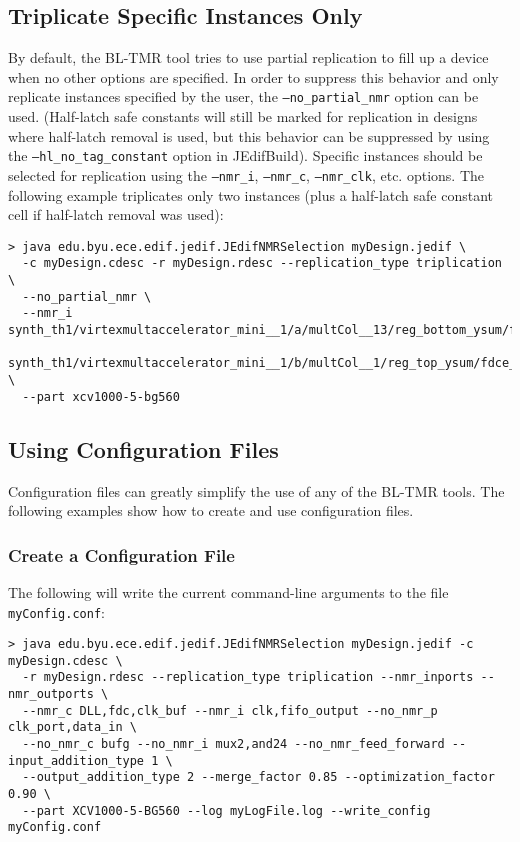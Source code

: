 \subsection{Triplicate Specific Instances Only}
By default, the BL-TMR tool tries to use partial replication to fill up a
device when no other options are specified. In order to suppress this behavior
and only replicate instances specified by the user, the
\texttt{--no\_partial\_nmr} option can be used. (Half-latch safe constants will
still be marked for replication in designs where half-latch removal is used, but
this behavior can be suppressed by using the \texttt{--hl\_no\_tag\_constant}
option in JEdifBuild). Specific instances should be selected for replication
using the \texttt{--nmr\_i}, \texttt{--nmr\_c}, \texttt{--nmr\_clk}, etc.
options. The following example triplicates only two instances (plus a
half-latch safe constant cell if half-latch removal was used):
\begin{verbatim}
> java edu.byu.ece.edif.jedif.JEdifNMRSelection myDesign.jedif \
  -c myDesign.cdesc -r myDesign.rdesc --replication_type triplication \
  --no_partial_nmr \
  --nmr_i synth_th1/virtexmultaccelerator_mini__1/a/multCol__13/reg_bottom_ysum/fdce,\
  synth_th1/virtexmultaccelerator_mini__1/b/multCol__1/reg_top_ysum/fdce__5 \
  --part xcv1000-5-bg560
\end{verbatim}

\subsection{Using Configuration Files}
\label{using config}
Configuration files can greatly simplify the use of any of the
BL-TMR tools.  The following examples show how to create and use
configuration files.

\subsubsection{Create a Configuration File}
The following will write the current command-line arguments to the file
\texttt{myConfig.conf}:

\begin{verbatim}
> java edu.byu.ece.edif.jedif.JEdifNMRSelection myDesign.jedif -c myDesign.cdesc \
  -r myDesign.rdesc --replication_type triplication --nmr_inports --nmr_outports \
  --nmr_c DLL,fdc,clk_buf --nmr_i clk,fifo_output --no_nmr_p clk_port,data_in \
  --no_nmr_c bufg --no_nmr_i mux2,and24 --no_nmr_feed_forward --input_addition_type 1 \
  --output_addition_type 2 --merge_factor 0.85 --optimization_factor 0.90 \
  --part XCV1000-5-BG560 --log myLogFile.log --write_config myConfig.conf
\end{verbatim}

